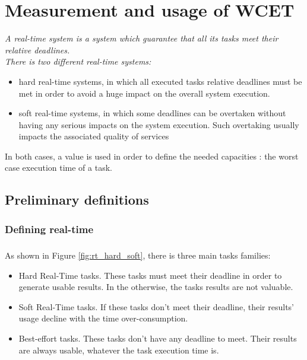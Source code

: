 
\chapter{Measurement and usage of WCET}


{\it
A real-time system is a system which guarantee that all its tasks meet their relative deadlines.\\
There is two different real-time systems:
\begin{itemize}
\item hard real-time systems, in which all executed tasks relative deadlines must be met in order
to avoid a huge impact on the overall system execution.
\item soft real-time systems, in which some deadlines can be overtaken without having any serious
impacts on the system execution. Such overtaking usually impacts the associated quality of services
\end{itemize}
In both cases, a value is used in order to define the needed capacities : the worst case execution
time of a task.
}
\doMinitoc

\section{Preliminary definitions}

\subsection{Defining real-time}

\paragraph{}
As shown in Figure \ref{fig:rt_hard_soft}, there is three main tasks families:
\begin{itemize}
\item Hard Real-Time tasks. These tasks must meet their deadline in order to generate usable
results. In the otherwise, the tasks results are not valuable.
\item Soft Real-Time tasks. If these tasks don't meet their deadline, their results' usage decline
with the time over-consumption.
\item Best-effort tasks. These tasks don't have any deadline to meet. Their results are always
usable, whatever the task execution time is.
\end{itemize}

